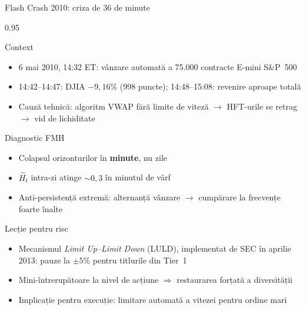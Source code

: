 \documentclass[9pt, aspectratio=169, t]{beamer}
\begin{document}
\begin{frame}[shrink=15]{Flash Crash 2010: criza de 36 de minute}
\begin{cminipage}{0.95\textwidth}
\begin{block}{Context}
\begin{itemize}\setlength{\itemsep}{0pt}
    \item 6 mai 2010, 14:32 ET: vânzare automată a 75.000 contracte E-mini S\&P~500
    \item 14:42--14:47: DJIA $-9{,}16\%$ (998 puncte); 14:48--15:08: revenire aproape totală
    \item Cauză tehnică: algoritm VWAP fără limite de viteză $\to$ HFT-urile se retrag $\to$ vid de lichiditate
\end{itemize}
\end{block}
\begin{alertblock}{Diagnostic FMH}
\begin{itemize}\setlength{\itemsep}{0pt}
    \item Colapsul orizonturilor în \textbf{minute}, nu zile
    \item $\hat H_t$ intra-zi atinge $\sim 0{,}3$ în minutul de vârf
    \item Anti-persistență extremă: alternanță vânzare $\to$ cumpărare la frecvențe foarte înalte
\end{itemize}
\end{alertblock}
\begin{exampleblock}{Lecție pentru risc}
\begin{itemize}\setlength{\itemsep}{0pt}
    \item Mecanismul \textit{Limit Up--Limit Down} (LULD), implementat de SEC în aprilie 2013: pauze la $\pm 5\%$ pentru titlurile din Tier~1
    \item Mini-întrerupătoare la nivel de acțiune $\Rightarrow$ restaurarea forțată a diversității
    \item Implicație pentru execuție: limitare automată a vitezei pentru ordine mari
\end{itemize}
\end{exampleblock}
\end{cminipage}
\end{frame}
\end{document}
